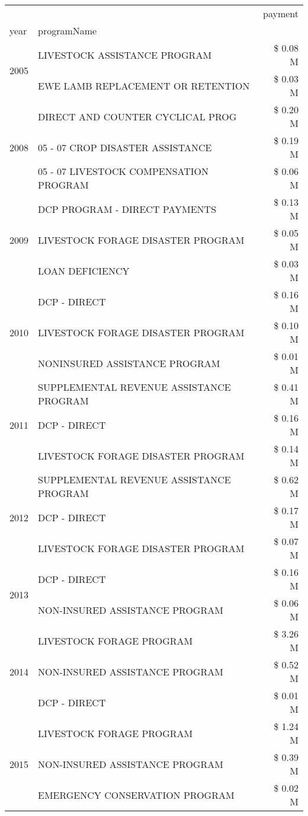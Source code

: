 \begin{tabular}{llr}
\toprule
 &  & payment \\
year & programName &  \\
\midrule
\multirow[t]{2}{*}{2005} & LIVESTOCK ASSISTANCE PROGRAM & \$ 0.08 M \\
 & EWE LAMB REPLACEMENT OR RETENTION & \$ 0.03 M \\
\cline{1-3}
\multirow[t]{3}{*}{2008} & DIRECT AND COUNTER CYCLICAL PROG & \$ 0.20 M \\
 & 05 - 07 CROP DISASTER ASSISTANCE & \$ 0.19 M \\
 & 05 - 07 LIVESTOCK COMPENSATION PROGRAM & \$ 0.06 M \\
\cline{1-3}
\multirow[t]{3}{*}{2009} & DCP PROGRAM - DIRECT PAYMENTS & \$ 0.13 M \\
 & LIVESTOCK FORAGE DISASTER  PROGRAM & \$ 0.05 M \\
 & LOAN DEFICIENCY & \$ 0.03 M \\
\cline{1-3}
\multirow[t]{3}{*}{2010} & DCP - DIRECT & \$ 0.16 M \\
 & LIVESTOCK FORAGE DISASTER PROGRAM & \$ 0.10 M \\
 & NONINSURED ASSISTANCE PROGRAM & \$ 0.01 M \\
\cline{1-3}
\multirow[t]{3}{*}{2011} & SUPPLEMENTAL REVENUE ASSISTANCE PROGRAM & \$ 0.41 M \\
 & DCP - DIRECT & \$ 0.16 M \\
 & LIVESTOCK FORAGE DISASTER PROGRAM & \$ 0.14 M \\
\cline{1-3}
\multirow[t]{3}{*}{2012} & SUPPLEMENTAL REVENUE ASSISTANCE PROGRAM & \$ 0.62 M \\
 & DCP - DIRECT & \$ 0.17 M \\
 & LIVESTOCK FORAGE DISASTER PROGRAM & \$ 0.07 M \\
\cline{1-3}
\multirow[t]{2}{*}{2013} & DCP - DIRECT & \$ 0.16 M \\
 & NON-INSURED ASSISTANCE PROGRAM & \$ 0.06 M \\
\cline{1-3}
\multirow[t]{3}{*}{2014} & LIVESTOCK FORAGE PROGRAM & \$ 3.26 M \\
 & NON-INSURED ASSISTANCE PROGRAM & \$ 0.52 M \\
 & DCP - DIRECT & \$ 0.01 M \\
\cline{1-3}
\multirow[t]{3}{*}{2015} & LIVESTOCK FORAGE PROGRAM & \$ 1.24 M \\
 & NON-INSURED ASSISTANCE PROGRAM & \$ 0.39 M \\
 & EMERGENCY CONSERVATION PROGRAM & \$ 0.02 M \\

\end{tabular}
